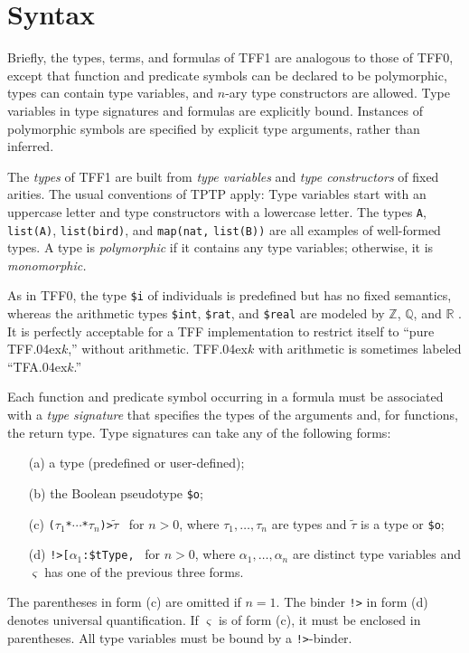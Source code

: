 \section{Syntax} \label{sec_syntax}

Briefly, the types, terms, and formulas of TFF1 are analogous to those of TFF0,
except that function and predicate symbols can be declared to be polymorphic,
types can contain type variables, and $n$-ary type constructors are allowed.
Type variables in type signatures and formulas are explicitly bound. Instances of
polymorphic symbols are specified by explicit type arguments, rather than
inferred.

 The {\em types\/} of TFF1 are built from {\em type
variables\/} and {\em type constructors\/} of fixed arities.
The usual conventions of TPTP
apply: Type variables start with an uppercase letter and type constructors
with a lowercase letter. The types \verb+A+, \verb+list(A)+, \verb+list(bird)+,
and \verb+map(nat,+ \verb+list(B))+ are all examples of well-formed types. A
type is {\em polymorphic} if it contains any type variables; otherwise, it is {\em
monomorphic.}

As in TFF0, the type {\tt \$i} %
of individuals is predefined but has no fixed semantics, whereas the
arithmetic types
{\tt \$int}, {\tt \$rat}, and {\tt \$real} are modeled by $\mathbb{Z}$,
$\mathbb{Q}$, and $\mathbb{R}$ \cite{sutcliffe-et-al-2012-tff0}.
It is perfectly acceptable for a TFF
implementation to restrict itself to ``pure TFF\kern.04ex$k$,''
without arithmetic. %
TFF\kern.04ex$k$ with arithmetic is sometimes labeled ``TFA\kern.04ex$k$.''

Each function and predicate symbol occurring in a formula must be associated
with a {\em type signature\/} that specifies the types of the arguments and, for
functions, the return type. Type signatures can take any of the following forms:
%
\begin{enumerate}
\item[(a)] a type (predefined or user-defined);
\item[(b)] the Boolean pseudotype {\tt \$o}; %
\item[(c)] {\tt ($\tau_1$\;*\;${\cdots}$\;*\;$\tau_n$)\;>\;$\tilde \tau$}
\ for $n > 0$, where $\tau_1,\dots,\tau_n$ are types and $\tilde \tau$ is
a type or {\tt \$o};
\item[(d)] {\tt !>[$\alpha_1$\;:\;\$tType,}\;{\tt ${\dots}$,}\;{\tt
$\alpha_n$\;:\;\$tType]:\;$\varsigma$}
\ for $n > 0$, where $\alpha_1,\dots,\alpha_n$ are distinct
type variables and $\varsigma$ has one of the previous three forms.
\end{enumerate}
%
The parentheses in form (c) are omitted if $n = 1$.
The binder {\tt !>} in form (d) denotes universal quantification.
If $\varsigma$ is of form (c), it must be enclosed in parentheses.
All type variables must be bound by a {\tt !>}-binder.

